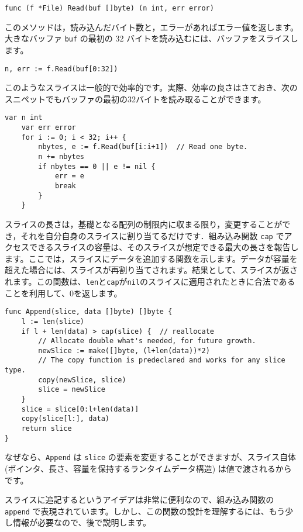 \documentclass{jsarticle}
\begin{document}
\begin{lstlisting}[numbers=none]
func (f *File) Read(buf []byte) (n int, err error)
\end{lstlisting}

このメソッドは，読み込んだバイト数と，エラーがあればエラー値を返します。大きなバッファ
\texttt{buf} の最初の 32
バイトを読み込むには、バッファをスライスします。

\begin{lstlisting}[numbers=none]
    n, err := f.Read(buf[0:32])
\end{lstlisting}

このようなスライスは一般的で効率的です。実際、効率の良さはさておき、次のスニペットでもバッファの最初の32バイトを読み取ることができます。

\begin{lstlisting}[numbers=none]
    var n int
    var err error
    for i := 0; i < 32; i++ {
        nbytes, e := f.Read(buf[i:i+1])  // Read one byte.
        n += nbytes
        if nbytes == 0 || e != nil {
            err = e
            break
        }
    }
\end{lstlisting}

スライスの長さは，基礎となる配列の制限内に収まる限り，変更することができ，それを自分自身のスライスに割り当てるだけです．組み込み関数
\texttt{cap}
でアクセスできるスライスの容量は、そのスライスが想定できる最大の長さを報告します。ここでは，スライスにデータを追加する関数を示します。データが容量を超えた場合には、スライスが再割り当てされます。結果として、スライスが返されます。この関数は、\texttt{len}と\texttt{cap}が\texttt{nil}のスライスに適用されたときに合法であることを利用して、0を返します。

\begin{lstlisting}[numbers=none]
func Append(slice, data []byte) []byte {
    l := len(slice)
    if l + len(data) > cap(slice) {  // reallocate
        // Allocate double what's needed, for future growth.
        newSlice := make([]byte, (l+len(data))*2)
        // The copy function is predeclared and works for any slice type.
        copy(newSlice, slice)
        slice = newSlice
    }
    slice = slice[0:l+len(data)]
    copy(slice[l:], data)
    return slice
}
\end{lstlisting}

なぜなら、\texttt{Append} は \texttt{slice}
の要素を変更することができますが、スライス自体
(ポインタ、長さ、容量を保持するランタイムデータ構造)
は値で渡されるからです。

スライスに追記するというアイデアは非常に便利なので、組み込み関数の
\texttt{append}
で表現されています。しかし、この関数の設計を理解するには、もう少し情報が必要なので、後で説明します。
\end{document}
